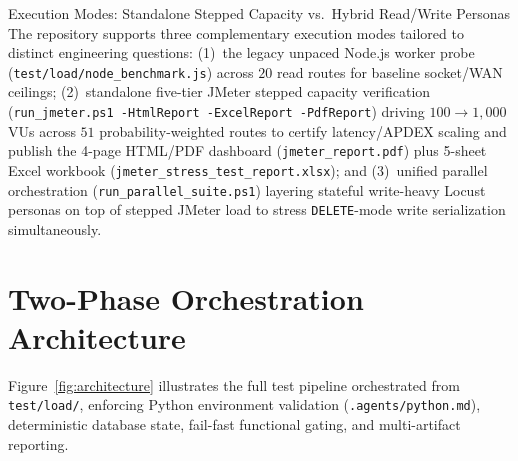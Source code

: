 \documentclass[11pt,letterpaper]{article}
\begin{document}
\begin{calloutbox}[TealSignal]{Execution Modes: Standalone Stepped Capacity vs.\ Hybrid Read/Write Personas}
The repository supports three complementary execution modes tailored to distinct engineering questions: (1)~the legacy unpaced Node.js worker probe (\texttt{test/load/node\_benchmark.js}) across $20$ read routes for baseline socket/WAN ceilings; (2)~standalone five-tier JMeter stepped capacity verification (\texttt{run\_jmeter.ps1 -HtmlReport -ExcelReport -PdfReport}) driving $100\to 1{,}000$ VUs across $51$ probability-weighted routes to certify latency/APDEX scaling and publish the 4-page HTML/PDF dashboard (\texttt{jmeter\_report.pdf}) plus 5-sheet Excel workbook (\texttt{jmeter\_stress\_test\_report.xlsx}); and (3)~unified parallel orchestration (\texttt{run\_parallel\_suite.ps1}) layering stateful write-heavy Locust personas on top of stepped JMeter load to stress \texttt{DELETE}-mode write serialization simultaneously.
\end{calloutbox}

\section{Two-Phase Orchestration Architecture}

Figure~\ref{fig:architecture} illustrates the full test pipeline orchestrated from \texttt{test/load/}, enforcing Python environment validation (\texttt{.agents/python.md}), deterministic database state, fail-fast functional gating, and multi-artifact reporting.
\end{document}
